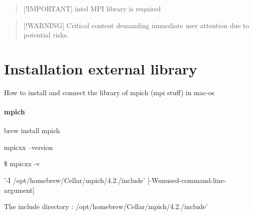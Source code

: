 \begin{quotation}
\mbox{[}!\-I\-M\-P\-O\-R\-T\-A\-N\-T\mbox{]} intel M\-P\-I library is required

\end{quotation}


\begin{quotation}
\mbox{[}!\-W\-A\-R\-N\-I\-N\-G\mbox{]} Critical content demanding immediate user attention due to potential risks.

\end{quotation}


\section*{Installation external library}

How to install and connect the library of mpich (mpi stuff) in mac-\/os \paragraph*{mpich}


\begin{DoxyItemize}
\item brew install mpich
\item mpicxx --version
\end{DoxyItemize}

\$ mpicxx -\/v
\begin{DoxyItemize}
\item '-\/\-I /opt/homebrew/\-Cellar/mpich/4.2./include' \mbox{[}-\/\-Wunused-\/command-\/line-\/argument\mbox{]}
\item The include directory \-: /opt/homebrew/\-Cellar/mpich/4.2./include' 
\end{DoxyItemize}
